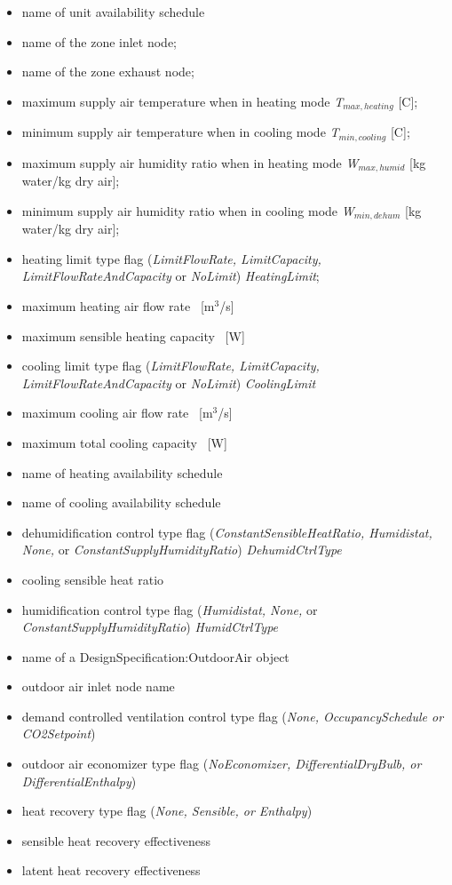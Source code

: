 \begin{itemize}
  \item name of unit availability schedule
  \item name of the zone inlet node;
  \item name of the zone exhaust node;
  \item maximum supply air temperature when in heating mode \emph{T\(_{max,heating}\)} {[}C{]};
  \item minimum supply air temperature when in cooling mode \emph{T\(_{min,cooling}\)} {[}C{]};
  \item maximum supply air humidity ratio when in heating mode \emph{W\(_{max,humid}\)} {[}kg water/kg dry air{]};
  \item minimum supply air humidity ratio when in cooling mode \emph{W\(_{min,dehum}\)} {[}kg water/kg dry air{]};
  \item heating limit type flag (\emph{LimitFlowRate, LimitCapacity, LimitFlowRateAndCapacity} or \emph{NoLimit}) \emph{HeatingLimit};
  \item maximum heating air flow rate~ {[}m\(^{3}\)/s{]}
  \item maximum sensible heating capacity~ {[}W{]}
  \item cooling limit type flag (\emph{LimitFlowRate, LimitCapacity, LimitFlowRateAndCapacity} or \emph{NoLimit}) \emph{CoolingLimit}
  \item maximum cooling air flow rate~ {[}m\(^{3}\)/s{]}
  \item maximum total cooling capacity~ {[}W{]}
  \item name of heating availability schedule
  \item name of cooling availability schedule
  \item dehumidification control type flag (\emph{ConstantSensibleHeatRatio, Humidistat, None,} or \emph{ConstantSupplyHumidityRatio}) \emph{DehumidCtrlType}
  \item cooling sensible heat ratio
  \item humidification control type flag (\emph{Humidistat, None,} or \emph{ConstantSupplyHumidityRatio}) \emph{HumidCtrlType}
  \item name of a DesignSpecification:OutdoorAir object
  \item outdoor air inlet node name
  \item demand controlled ventilation control type flag (\emph{None, OccupancySchedule or CO2Setpoint})
  \item outdoor air economizer type flag (\emph{NoEconomizer, DifferentialDryBulb, or DifferentialEnthalpy})
  \item heat recovery type flag (\emph{None, Sensible, or Enthalpy})
  \item sensible heat recovery effectiveness
  \item latent heat recovery effectiveness
\end{itemize}


